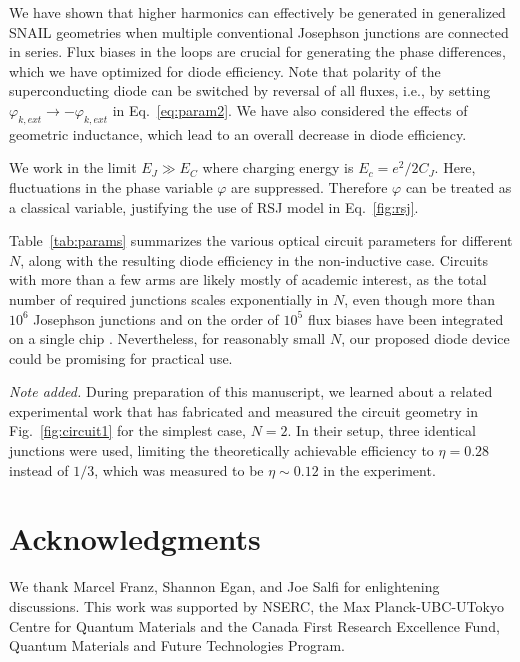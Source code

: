 \documentclass[aps,rsi,reprint,amsmath,amssymb,floatfix,longbibliography,superscriptaddress]{revtex4-1}
\begin{document}
We have shown that higher harmonics can effectively be generated in generalized SNAIL geometries when multiple conventional Josephson junctions are connected in series. Flux biases in the loops are crucial for generating the phase differences, which we have optimized for diode efficiency. 
Note that polarity of the superconducting diode can be switched by 
reversal of all fluxes, i.e., by setting $\varphi_{k,ext} \rightarrow
-\varphi_{k,ext}$ in Eq.~\eqref{eq:param2}.
We have also considered the effects of geometric inductance, which lead to an overall decrease in diode efficiency.

We work in the limit $E_J \gg E_C $ where charging energy is $E_c = e^2/2C_J$. Here, fluctuations in the phase variable $\varphi$ are suppressed. Therefore $\varphi$ can be treated as a classical variable, justifying the use of RSJ model in Eq.~\eqref{fig:rsj}.

Table~\ref{tab:params} summarizes the various optical circuit parameters for different $N$, along with the resulting diode efficiency in the non-inductive case. Circuits with more than a few arms are likely mostly of academic interest, as the total number of required junctions scales exponentially in $N$, even though more than $10^6$ Josephson junctions and on the order of $10^5$ flux biases have been integrated on a single chip \cite{DWave2010,DWave2021}. Nevertheless, for reasonably small $N$, our proposed diode device could be promising for practical use. 



\textit{Note added.} During preparation of this manuscript, we learned about a related experimental work \cite{Gupta2022} that has fabricated and measured the circuit geometry in Fig.~\ref{fig:circuit1} for the simplest case, $N=2$. In their setup, three identical junctions were used, limiting the theoretically achievable efficiency to $\eta=0.28$ instead of $1/3$, which was measured to be $\eta\sim 0.12$ in the experiment.

\section{Acknowledgments}
We thank Marcel Franz, Shannon Egan, and Joe Salfi for enlightening discussions. This work was supported by NSERC, the Max Planck-UBC-UTokyo Centre for Quantum Materials and the Canada First Research Excellence Fund, Quantum Materials and Future Technologies Program.  
\end{document}
